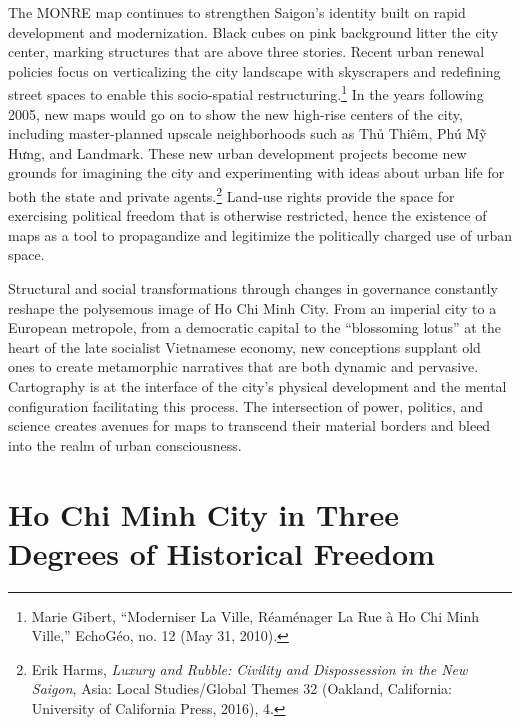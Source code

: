 The MONRE map continues to strengthen Saigon’s identity built on rapid development and modernization. Black cubes on pink background litter the city center, marking structures that are above three stories. Recent urban renewal policies focus on verticalizing the city landscape with skyscrapers and redefining street spaces to enable this socio-spatial restructuring.\footnote{Marie Gibert, “Moderniser La Ville, Réaménager La Rue à Ho Chi Minh Ville,” EchoGéo, no. 12 (May 31, 2010).} In the years following 2005, new maps would go on to show the new high-rise centers of the city, including master-planned upscale neighborhoods such as Thủ Thiêm, Phú Mỹ Hưng, and Landmark. These new urban development projects become new grounds for imagining the city and experimenting with ideas about urban life for both the state and private agents.\footnote{Erik Harms, \textit{Luxury and Rubble: Civility and Dispossession in the New Saigon}, Asia: Local Studies/Global Themes 32 (Oakland, California: University of California Press, 2016), 4.} Land-use rights provide the space for exercising political freedom that is otherwise restricted, hence the existence of maps as a tool to propagandize and legitimize the politically charged use of urban space.

Structural and social transformations through changes in governance constantly reshape the polysemous image of Ho Chi Minh City. From an imperial city to a European metropole, from a democratic capital to the “blossoming lotus” at the heart of the late socialist Vietnamese economy, new conceptions supplant old ones to create metamorphic narratives that are both dynamic and pervasive. Cartography is at the interface of the city’s physical development and the mental configuration facilitating this process. The intersection of power, politics, and science creates avenues for maps to transcend their material borders and bleed into the realm of urban consciousness.

\section{Ho Chi Minh City in Three Degrees of Historical Freedom}


